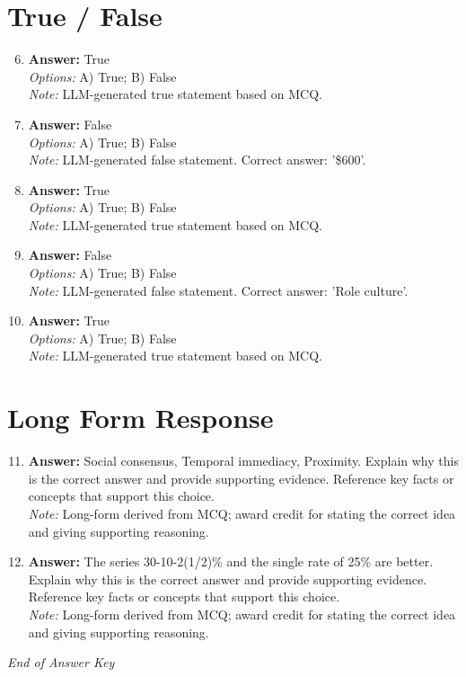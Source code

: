 \documentclass[12pt]{article}
\begin{document}
\section*{True / False}
\begin{enumerate}[label=\arabic*.]
\setcounter{enumi}{5}
\item \textbf{Answer:} True
\\ \textit{Options:} A) True; B) False
\\ \textit{Note:} LLM-generated true statement based on MCQ.
\item \textbf{Answer:} False
\\ \textit{Options:} A) True; B) False
\\ \textit{Note:} LLM-generated false statement. Correct answer: '\$600'.
\item \textbf{Answer:} True
\\ \textit{Options:} A) True; B) False
\\ \textit{Note:} LLM-generated true statement based on MCQ.
\item \textbf{Answer:} False
\\ \textit{Options:} A) True; B) False
\\ \textit{Note:} LLM-generated false statement. Correct answer: 'Role culture'.
\item \textbf{Answer:} True
\\ \textit{Options:} A) True; B) False
\\ \textit{Note:} LLM-generated true statement based on MCQ.
\end{enumerate}

\section*{Long Form Response}
\begin{enumerate}[label=\arabic*.]
\setcounter{enumi}{10}
\item \textbf{Answer:} Social consensus, Temporal immediacy, Proximity. Explain why this is the correct answer and provide supporting evidence. Reference key facts or concepts that support this choice.
\\ \textit{Note:} Long-form derived from MCQ; award credit for stating the correct idea and giving supporting reasoning.
\item \textbf{Answer:} The series 30-10-2(1/2)\% and the single rate of 25\% are better. Explain why this is the correct answer and provide supporting evidence. Reference key facts or concepts that support this choice.
\\ \textit{Note:} Long-form derived from MCQ; award credit for stating the correct idea and giving supporting reasoning.
\end{enumerate}

\vfill
\noindent\textit{End of Answer Key}
\end{document}
